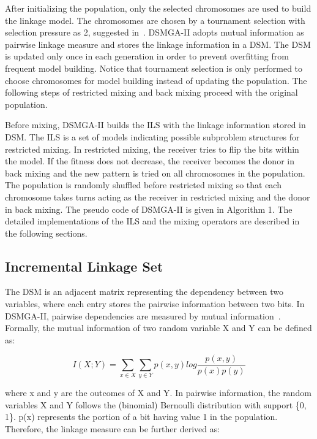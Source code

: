 \documentclass{sig-alternate-05-2015}
\begin{document}
After initializing the population, only the selected chromosomes are used to build the linkage model. The chromosomes are chosen by a tournament selection with selection pressure as 2, suggested in~\cite{yu:population}. DSMGA-II adopts mutual information as pairwise linkage measure and stores the linkage information in a DSM. The DSM is updated only once in each generation in order to prevent overfitting from frequent model building. Notice that tournament selection is only performed to choose chromosomes for model building instead of updating the population. The following steps of restricted mixing and back mixing proceed with the original population.


Before mixing, DSMGA-II builds the ILS with the linkage information stored in DSM. The ILS is a set of models indicating possible subproblem structures for restricted mixing. In restricted mixing, the receiver tries to flip the bits within the model. If the fitness does not decrease, the receiver becomes the donor in back mixing and the new pattern is tried on all chromosomes in the population. The population is randomly shuffled before restricted mixing so that each chromosome takes turns acting as the receiver in restricted mixing and the donor in back mixing. The pseudo code of DSMGA-II is given in Algorithm 1. The detailed implementations of the ILS and the mixing operators are described in the following sections. 



\subsection{Incremental Linkage Set}
The DSM is an adjacent matrix representing the dependency between two variables, where each entry stores the pairwise information between two bits. In DSMGA-II, pairwise dependencies are measured by mutual information~\cite{kullback:KL-diversion}. Formally, the mutual information of two random variable X and Y can be defined as:

\begin{displaymath} 
I(X;Y) = \sum_{x \in X}\sum_{y \in Y} p(x,y)  log \frac{p(x,y)}{p(x) p(y)} 
\end{displaymath}

where x and y are the outcomes of X and Y. In pairwise information, the random variables X and Y follows the (binomial) Bernoulli distribution with support \{0, 1\}. p(x) represents the portion of a bit having value 1 in the population. Therefore, the linkage measure can be further derived as:
\end{document}
